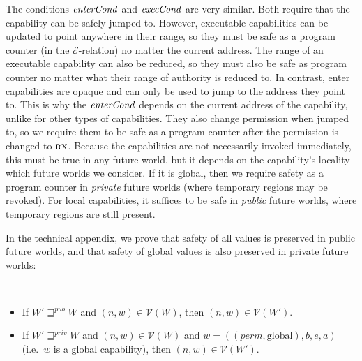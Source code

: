\documentclass[format=acmsmall, review=true, screen=true]{acmart}
\newcommand{\var}[1]{\mathit{#1}}
\newcommand{\gl}{\var{g}}
\newcommand{\addr}{\var{a}}
\newcommand{\start}{\var{b}}
\newcommand{\addrend}{\var{e}}
\newcommand{\perm}{\var{perm}}
\newcommand{\stdcap}[1][(\perm,\gl)]{\left(#1,\start,\addrend,\addr \right)}
\newcommand{\plainfun}[2]{
  \ifthenelse{\equal{#2}{}}
  {\mathit{#1}}
  {\mathit{#1}(#2)}
}
\newcommand{\execCond}[1]{\plainfun{execCond}{#1}}
\newcommand{\entryCond}[1]{\plainfun{enterCond}{#1}}
\newcommand{\futurewk}{\mathbin{\sqsupseteq}^{\var{pub}}}
\newcommand{\futurestr}{\mathbin{\sqsupseteq}^{\var{priv}}}
\newcommand{\asmType}{\plaindom{AsmType}}
\newcommand{\plaindom}[1]{\mathrm{#1}}
\newcommand{\intr}[2]{\mathcal{#1}}
\newcommand{\valueintr}[1]{\intr{V}{#1}}
\newcommand{\exprintr}[1]{\intr{E}{#1}}
\newcommand{\stdvr}{\valueintr{\asmType}}
\newcommand{\stder}{\exprintr{\asmType}}
\newcommand{\npair}[2][n]{\left(#1,#2 \right)}
\newcommand{\plainperm}[1]{\textsc{#1}}
\newcommand{\exec}{\plainperm{rx}}
\newcommand{\plainlocality}[1]{\mathrm{#1}}
\newcommand{\glob}{\plainlocality{global}}
\newenvironment{toplas}{}{}
\newcommand{\itoplas}[1]{#1}
\begin{document}
The conditions $\entryCond{}$ and $\execCond{}$ are very similar. Both require
that the capability can be safely jumped to. However, executable capabilities
can be updated to point anywhere in their range, so they must be safe as a
program counter (in the $\stder$-relation) no matter the current address.
\itoplas{The range of an executable capability can also be reduced, so they must also be safe as program counter no matter what their range of authority is reduced to.}
In contrast, enter capabilities are opaque and can only be used to jump to the
address they point to.%
\begin{toplas}%
  This is why the $\entryCond{}$ depends on the current address of the capability, unlike for other types of capabilities.
\end{toplas}
They also change permission when jumped to, so we require
them to be safe as a program counter after the permission is changed to $\exec$.
Because the capabilities are not necessarily invoked immediately, this must be
true in any future world, but it depends on the capability's locality which
future worlds we consider. If it is global, then we require safety as a program
counter in \emph{private} future worlds (where temporary regions may be
revoked). For local capabilities, it suffices to be safe in \emph{public} future
worlds, where temporary regions are still present.

In the technical appendix, we prove that safety of all values is
preserved in public future worlds, and that safety of global values is
also preserved in private future worlds:
\begin{lemma}~
  \begin{itemize}
  \item If $W' \futurewk W$ and $\npair{w} \in \stdvr(W)$, then $\npair{w} \in
    \stdvr(W')$.
  \item If $W' \futurestr W$ and $\npair{w} \in \stdvr(W)$ and $w =
    \stdcap[(\perm,\glob)]$ (i.e.\ $w$ is a global capability), then $\npair{w}
    \in \stdvr(W')$.
  \end{itemize}
\end{lemma}
\end{document}
